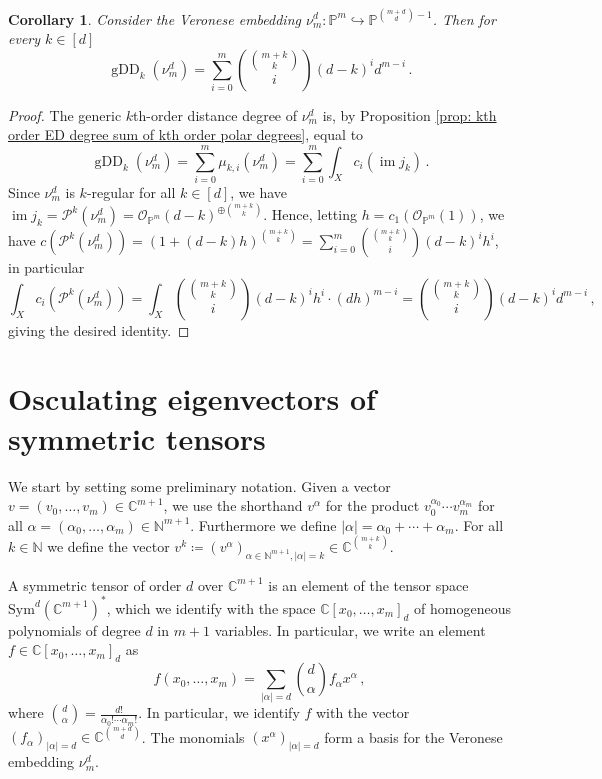 \documentclass[11pt,reqno]{amsart}
\numberwithin{equation}{section}
\theoremstyle{plain}
\numberwithin{theorem}{section}
\newtheorem{corollary}[theorem]{Corollary}
\theoremstyle{definition}
\newcommand{\N}{\mathbb{N}}
\renewcommand{\P}{\mathbb{P}}
\newcommand{\C}{\mathbb{C}}
\newcommand{\OO}{\mathcal{O}}
\newcommand{\PP}{\mathcal{P}}
\newcommand{\gDD}{\operatorname{gDD}}
\newcommand{\image}{\operatorname{im}}
\begin{document}
\begin{corollary}\label{corol: generic kth ED degree Veronese}
Consider the Veronese embedding $\nu_m^d\colon\P^m\hookrightarrow\P^{\binom{m+d}{d}-1}$. Then for every $k\in[d]$
\begin{equation}\label{eq: explicit EDD k polar classes Veronese}
    \gDD_k(\nu_m^d) = \sum_{i=0}^m \binom{\binom{m+k}{k}}{i}(d-k)^id^{m-i}\,.
\end{equation}
\end{corollary}
\begin{proof}
The generic $k$th-order distance degree of $\nu_m^d$ is, by Proposition \ref{prop: kth order ED degree sum of kth order polar degrees}, equal to
\begin{equation}\label{eq: EDD k polar classes Veronese}
    \gDD_k(\nu_m^d) = \sum_{i=0}^m \mu_{k,i}(\nu_m^d) = \sum_{i=0}^m\int_X c_i(\image j_k)\,.
\end{equation}
Since $\nu_m^d$ is $k$-regular for all $k\in[d]$, we have $\image j_k=\PP^k(\nu_m^d)=\OO_{\P^m}(d-k)^{\oplus\binom{m+k}{k}}$. Hence, letting $h=c_1(\OO_{\P^m}(1))$, we have $c(\PP^k(\nu_m^d)) = (1+(d-k)h)^{\binom{m+k}{k}} = \sum_{i=0}^m\binom{\binom{m+k}{k}}{i}(d-k)^ih^i$, in particular
\[
\int_X c_i(\PP^k(\nu_m^d)) = \int_X \binom{\binom{m+k}{k}}{i}(d-k)^ih^i\cdot (dh)^{m-i}=\binom{\binom{m+k}{k}}{i}(d-k)^id^{m-i}\,,
\]
giving the desired identity.
\end{proof}











\section{Osculating eigenvectors of symmetric tensors}\label{sec: osculating eigenvectors}

We start by setting some preliminary notation. Given a vector $v=(v_0,\dots,v_m)\in\C^{m+1}$, we use the shorthand $v^\alpha$ for the product $v_0^{\alpha_0}\cdots v_m^{\alpha_m}$ for all $\alpha=(\alpha_0,\dots,\alpha_m)\in\N^{m+1}$. Furthermore we define $|\alpha|=\alpha_0+\cdots+\alpha_m$. For all $k\in\N$ we define the vector $v^k\coloneqq (v^\alpha)_{\alpha\in\N^{m+1},|\alpha|=k}\in\C^{\binom{m+k}{k}}$.

A symmetric tensor of order $d$ over $\C^{m+1}$ is an element of the tensor space $\mathrm{Sym}^d(\C^{m+1})^*$, which we identify with the space $\C[x_0,\dots,x_m]_d$ of homogeneous polynomials of degree $d$ in $m+1$ variables. In particular, we write an element $f\in \C[x_0,\dots,x_m]_d$ as
\begin{equation}\label{eq: write f}
f(x_0,\dots,x_m) = \sum_{|\alpha|=d}\binom{d}{\alpha}f_\alpha x^\alpha\,,
\end{equation}
where $\binom{d}{\alpha}=\frac{d!}{\alpha_0!\cdots\alpha_m!}$. In particular, we identify $f$ with the vector $(f_\alpha)_{|\alpha|=d}\in\C^{\binom{m+d}{d}}$.
The monomials $(x^\alpha)_{|\alpha|=d}$ form a basis for the Veronese embedding $\nu_m^d$. 
\end{document}
